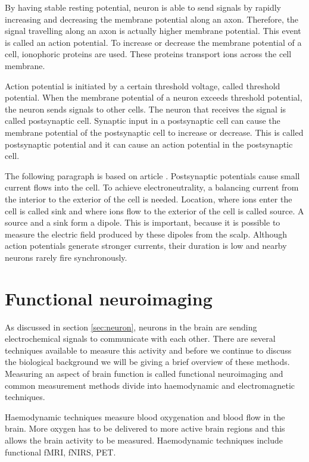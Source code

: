 By having stable resting potential, neuron is able to send signals by rapidly increasing and decreasing the membrane potential along an axon. Therefore, the signal travelling along an axon is actually higher membrane potential. This event is called an action potential. To increase or decrease the membrane potential of a cell, ionophoric proteins are used. These proteins transport ions across the cell membrane.

Action potential is initiated by a certain threshold voltage, called threshold potential. When the membrane potential of a neuron exceeds threshold potential, the neuron sends signals to other cells. The neuron that receives the signal is called postsynaptic cell. Synaptic input in a postsynaptic cell can cause the membrane potential of the postsynaptic cell to increase or decrease. This is called postsynaptic potential and it can cause an action potential in the postsynaptic cell.

The following paragraph is based on article \cite{electric_field}. Postsynaptic potentials cause small current flows into the cell. To achieve electroneutrality, a balancing current from the interior to the exterior of the cell is needed. Location, where ions enter the cell is called sink and where ions flow to the exterior of the cell is called source. A source and a sink form a dipole. This is important, because it is possible to measure the electric field produced by these dipoles from the scalp. Although action potentials generate stronger currents, their duration is low and nearby neurons rarely fire synchronously.

\section{Functional neuroimaging}
\label{sec:neuroimaging}

As discussed in section \ref{sec:neuron}, neurons in the brain are sending electrochemical signals to communicate with each other. There are several techniques available to measure this activity and before we continue to discuss the biological background we will be giving a brief overview of these methods. Measuring an aspect of brain function is called functional neuroimaging and common measurement methods divide into haemodynamic and electromagnetic techniques.

Haemodynamic techniques measure blood oxygenation and blood flow in the brain. More oxygen has to be delivered to more active brain regions and this allows the brain activity to be measured. Haemodynamic techniques include functional \acrfull{fMRI}, \acrfull{fNIRS}, \acrfull{PET}.

